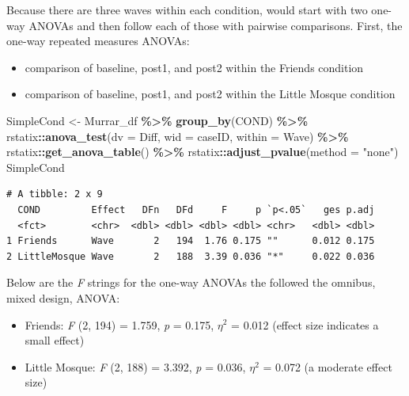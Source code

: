 \documentclass[
  11pt,
]{book}
\newenvironment{Shaded}{\begin{snugshade}}{\end{snugshade}}
\newcommand{\AttributeTok}[1]{\textcolor[rgb]{0.27,0.27,0.27}{#1}}
\newcommand{\FunctionTok}[1]{\textcolor[rgb]{0.27,0.27,0.27}{\textbf{#1}}}
\newcommand{\NormalTok}[1]{#1}
\newcommand{\OtherTok}[1]{\textcolor[rgb]{0.37,0.37,0.37}{#1}}
\newcommand{\SpecialCharTok}[1]{\textcolor[rgb]{0.43,0.43,0.43}{\textbf{#1}}}
\newcommand{\StringTok}[1]{\textcolor[rgb]{0.5,0.5,0.5}{#1}}
\providecommand{\tightlist}{%
  \setlength{\itemsep}{0pt}\setlength{\parskip}{0pt}}
\begin{document}
Because there are three waves within each condition, would start with two one-way ANOVAs and then follow each of those with pairwise comparisons. First, the one-way repeated measures ANOVAs:

\begin{itemize}
\tightlist
\item
  comparison of baseline, post1, and post2 within the Friends condition
\item
  comparison of baseline, post1, and post2 within the Little Mosque condition
\end{itemize}

\begin{Shaded}
\begin{Highlighting}[]
\NormalTok{SimpleCond }\OtherTok{\textless{}{-}}\NormalTok{ Murrar\_df }\SpecialCharTok{\%\textgreater{}\%}
    \FunctionTok{group\_by}\NormalTok{(COND) }\SpecialCharTok{\%\textgreater{}\%}
\NormalTok{    rstatix}\SpecialCharTok{::}\FunctionTok{anova\_test}\NormalTok{(}\AttributeTok{dv =}\NormalTok{ Diff, }\AttributeTok{wid =}\NormalTok{ caseID, }\AttributeTok{within =}\NormalTok{ Wave) }\SpecialCharTok{\%\textgreater{}\%}
\NormalTok{    rstatix}\SpecialCharTok{::}\FunctionTok{get\_anova\_table}\NormalTok{() }\SpecialCharTok{\%\textgreater{}\%}
\NormalTok{    rstatix}\SpecialCharTok{::}\FunctionTok{adjust\_pvalue}\NormalTok{(}\AttributeTok{method =} \StringTok{"none"}\NormalTok{)}
\NormalTok{SimpleCond}
\end{Highlighting}
\end{Shaded}

\begin{verbatim}
# A tibble: 2 x 9
  COND         Effect   DFn   DFd     F     p `p<.05`   ges p.adj
  <fct>        <chr>  <dbl> <dbl> <dbl> <dbl> <chr>   <dbl> <dbl>
1 Friends      Wave       2   194  1.76 0.175 ""      0.012 0.175
2 LittleMosque Wave       2   188  3.39 0.036 "*"     0.022 0.036
\end{verbatim}

Below are the \emph{F} strings for the one-way ANOVAs the followed the omnibus, mixed design, ANOVA:

\begin{itemize}
\tightlist
\item
  Friends: \emph{F} (2, 194) = 1.759, \emph{p} = 0.175, \(\eta^{2}\) = 0.012 (effect size indicates a small effect)
\item
  Little Mosque: \emph{F} (2, 188) = 3.392, \emph{p} = 0.036, \(\eta^{2}\) = 0.072 (a moderate effect size)
\end{itemize}
\end{document}
